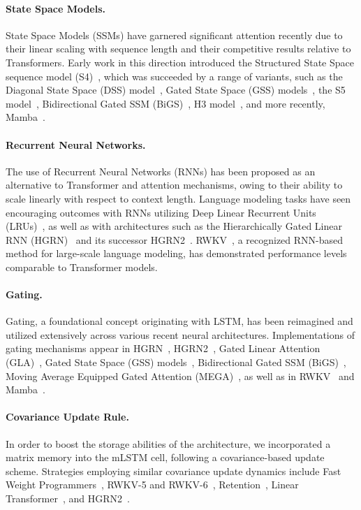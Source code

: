 \paragraph{State Space Models.} State Space Models (SSMs) have garnered significant attention recently due to their linear scaling with sequence length and their competitive results relative to Transformers. Early work in this direction introduced the Structured State Space sequence model (S4)~\citep{Gu:21}, which was succeeded by a range of variants, such as the Diagonal State Space (DSS) model~\citep{Gupta:22}, Gated State Space (GSS) models~\citep{Mehta:22}, the S5 model~\citep{Smith:22}, Bidirectional Gated SSM (BiGS)~\citep{Wang:22}, H3 model~\citep{Fu:23}, and more recently, Mamba~\citep{Gu:24arxiv}.

\paragraph{Recurrent Neural Networks.} The use of Recurrent Neural Networks (RNNs) has been proposed as an alternative to Transformer and attention mechanisms, owing to their ability to scale linearly with respect to context length. Language modeling tasks have seen encouraging outcomes with RNNs utilizing Deep Linear Recurrent Units (LRUs)~\citep{Orvieto:23, De:24arxiv}, as well as with architectures such as the Hierarchically Gated Linear RNN (HGRN)~\citep{Qin:23} and its successor HGRN2~\citep{Qin:24arxiv}. RWKV~\citep{Peng:23arxivshort,Peng:24arxivshort}, a recognized RNN-based method for large-scale language modeling, has demonstrated performance levels comparable to Transformer models.

\paragraph{Gating.}
Gating, a foundational concept originating with LSTM, has been reimagined and utilized extensively across various recent neural architectures. Implementations of gating mechanisms appear in HGRN~\citep{Qin:23}, HGRN2~\citep{Qin:24arxiv}, Gated Linear Attention (GLA)~\citep{Yang:23arxiv}, Gated State Space (GSS) models~\citep{Mehta:22}, Bidirectional Gated SSM (BiGS)~\citep{Wang:22}, Moving Average Equipped Gated Attention (MEGA)~\citep{Ma:22}, as well as in RWKV~\citep{Peng:23arxivshort} and Mamba~\citep{Gu:24arxiv}.

\paragraph{Covariance Update Rule.} In order to boost the storage abilities of the architecture, we incorporated a matrix memory into the mLSTM cell, following a covariance-based update scheme. Strategies employing similar covariance update dynamics include Fast Weight Programmers~\citep{Schmidhuber:92ncfastweights,Schlag:21}, RWKV-5 and RWKV-6~\citep{Peng:24arxivshort}, Retention~\citep{Sun:23arxiv}, Linear Transformer~\citep{Katharopoulos:20}, and HGRN2~\citep{Qin:24arxiv}.

